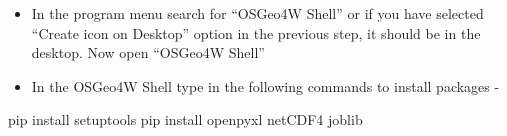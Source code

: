 \documentclass[letterpaper,10pt,english]{sphinxmanual}
\let\sphinxpxdimen\pdfpxdimen\else\newdimen\sphinxpxdimen
\begin{document}
\begin{DUlineblock}{0em}
\item[] 
\end{DUlineblock}
\begin{itemize}
\item {} 
In the program menu search for “OSGeo4W Shell” or if you have selected “Create icon on Desktop” option in the previous step, it should be in the desktop. Now open “OSGeo4W Shell”

\end{itemize}

\begin{figure}[htbp]
\centering

\noindent\sphinxincludegraphics[width=200\sphinxpxdimen]{{shell1}.png}
\end{figure}
\begin{itemize}
\item {} 
In the OSGeo4W Shell type in the following commands to install packages - 

\end{itemize}

\begin{sphinxVerbatim}[commandchars=\\\{\},numbers=left,firstnumber=1,stepnumber=1]
pip install setuptools
pip install openpyxl netCDF4 joblib
\end{sphinxVerbatim}
\end{document}
